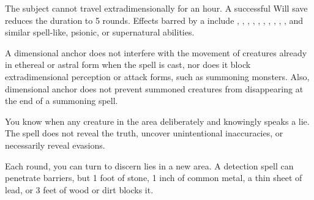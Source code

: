 \spellrng{\rngmed}
\begin{spelleffect}
  The subject cannot travel extradimensionally for an hour. A successful Will save reduces the duration to 5 rounds. Effects barred by a  include , , , , , , , , , , and similar spell-like, psionic, or supernatural abilities.
\end{spelleffect}
\begin{spellnotes}
  A dimensional anchor does not interfere with the movement of creatures already in ethereal or astral form when the spell is cast, nor does it block extradimensional perception or attack forms, such as summoning monsters. Also, dimensional anchor does not prevent summoned creatures from disappearing at the end of a summoning spell. 
\end{spellnotes}

\begin{spelleffect}
  You know when any creature in the area deliberately and knowingly speaks a lie. The spell does not reveal the truth, uncover unintentional inaccuracies, or necessarily reveal evasions.
\end{spelleffect}
\begin{spellnotes}
  Each round, you can turn to discern lies in a new area. A detection spell can penetrate barriers, but 1 foot of stone, 1 inch of common metal, a thin sheet of lead, or 3 feet of wood or dirt blocks it.
\end{spellnotes}

